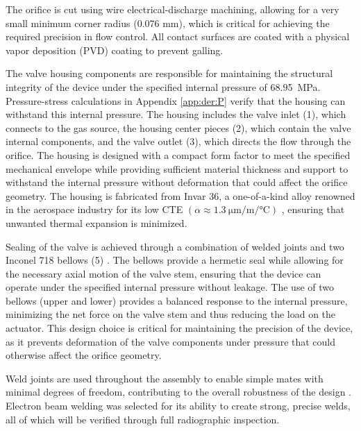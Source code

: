 \documentclass[12pt, letterpaper]{report}%
\begin{document}
    The orifice is cut using wire electrical-discharge machining, allowing 
    for a very small minimum corner radius (0.076 mm), which is critical for achieving the required precision in flow control. All contact surfaces are coated with a physical vapor deposition (PVD) coating to prevent galling.

    The valve housing components are responsible for maintaining the structural integrity of the device under the specified internal pressure of \SI{68.95}{\mega\pascal}.
    Pressure-stress calculations in Appendix \ref{app:der:P} verify that the housing can withstand this internal pressure.
    The housing includes the valve inlet (1), which connects to the gas source, the housing center pieces (2), which contain the valve internal components, and the valve outlet (3), which directs the flow through the orifice.
    The housing is designed with a compact form factor to meet the specified mechanical envelope while providing sufficient material thickness and support to withstand the internal pressure without deformation that could affect the orifice geometry.
    The housing is fabricated from Invar 36, a one-of-a-kind alloy renowned in the aerospace industry for its low CTE $(\alpha \approx \SI{1.3}{\micro\meter\per\meter\per\celsius})$ \cite{ref_Carpenter_Inv, ref_Invar_1897, ref_Invar_1920},
    ensuring that unwanted thermal expansion is minimized.

    Sealing of the valve is achieved through a combination of welded joints and two Inconel 718 bellows (5) \cite{ref_miniflex_design}. The bellows provide a hermetic seal while allowing for the 
    necessary axial motion of the valve stem, ensuring that the device can operate under the specified internal pressure without leakage. 
    The use of two bellows (upper and lower) provides a balanced response to the internal pressure, minimizing the net force on the valve stem and thus reducing the 
    load on the actuator. This design choice is critical for maintaining the precision of the device, as it prevents deformation of the valve components under pressure 
    that could otherwise affect the orifice geometry.

    Weld joints are used throughout the assembly to enable simple mates with minimal degrees of freedom, contributing to the overall robustness
    of the design \cite{ref_steen2010laser}. Electron beam welding was selected for its ability to create strong, precise welds, all of which will be verified through full radiographic inspection.
\end{document}
